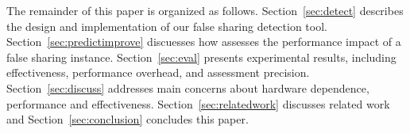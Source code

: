 The remainder of this paper is organized as follows. 
Section~\ref{sec:detect} describes the design and implementation of our false sharing detection tool. Section~\ref{sec:predictimprove} discuesses how \cheetah{} assesses the performance impact of a false sharing instance. Section~\ref{sec:eval} presents experimental results, including effectiveness, performance overhead, and assessment precision. Section~\ref{sec:discuss} addresses main concerns about hardware dependence, performance and effectiveness. Section~\ref{sec:relatedwork} discusses related work and Section~\ref{sec:conclusion} concludes this paper. 



